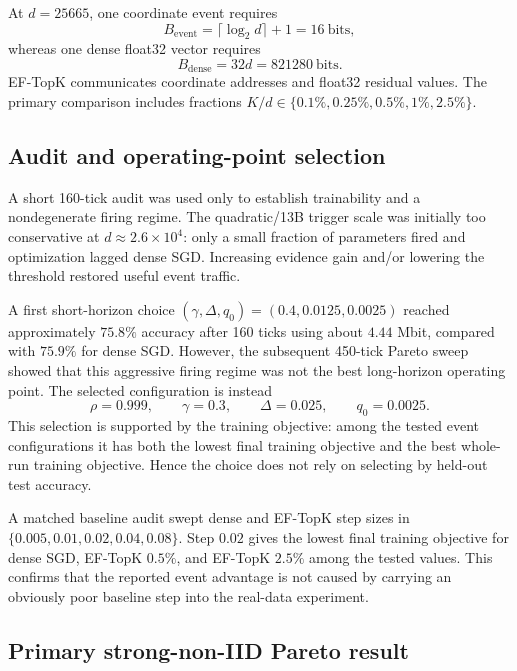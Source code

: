 At $d=25665$, one coordinate event requires
\begin{equation}
B_{\mathrm{event}}=\lceil\log_2d\rceil+1=16\ \text{bits},
\end{equation}
whereas one dense float32 vector requires
\begin{equation}
B_{\mathrm{dense}}=32d=821280\ \text{bits}.
\end{equation}
EF-TopK communicates coordinate addresses and float32 residual values. The primary comparison includes fractions $K/d\in\{0.1\%,0.25\%,0.5\%,1\%,2.5\%\}$.

\subsection{Audit and operating-point selection}

A short 160-tick audit was used only to establish trainability and a nondegenerate firing regime. The quadratic/13B trigger scale was initially too conservative at $d\approx2.6\times10^4$: only a small fraction of parameters fired and optimization lagged dense SGD. Increasing evidence gain and/or lowering the threshold restored useful event traffic.

A first short-horizon choice $(\gamma,\Delta,q_0)=(0.4,0.0125,0.0025)$ reached approximately $75.8\%$ accuracy after 160 ticks using about $4.44$ Mbit, compared with $75.9\%$ for dense SGD. However, the subsequent 450-tick Pareto sweep showed that this aggressive firing regime was not the best long-horizon operating point. The selected configuration is instead
\begin{equation}
\boxed{
\rho=0.999,\qquad
\gamma=0.3,\qquad
\Delta=0.025,\qquad
q_0=0.0025.
}
\end{equation}
This selection is supported by the training objective: among the tested event configurations it has both the lowest final training objective and the best whole-run training objective. Hence the choice does not rely on selecting by held-out test accuracy.

A matched baseline audit swept dense and EF-TopK step sizes in $\{0.005,0.01,0.02,0.04,0.08\}$. Step $0.02$ gives the lowest final training objective for dense SGD, EF-TopK $0.5\%$, and EF-TopK $2.5\%$ among the tested values. This confirms that the reported event advantage is not caused by carrying an obviously poor baseline step into the real-data experiment.

\subsection{Primary strong-non-IID Pareto result}


